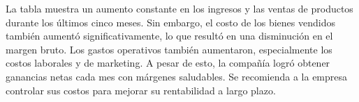 La tabla muestra un aumento constante en los ingresos y las ventas de productos durante los últimos cinco meses. Sin embargo, el costo de los bienes vendidos también aumentó significativamente, lo que resultó en una disminución en el margen bruto. Los gastos operativos también aumentaron, especialmente los costos laborales y de marketing. A pesar de esto, la compañía logró obtener ganancias netas cada mes con márgenes saludables. Se recomienda a la empresa controlar sus costos para mejorar su rentabilidad a largo plazo.